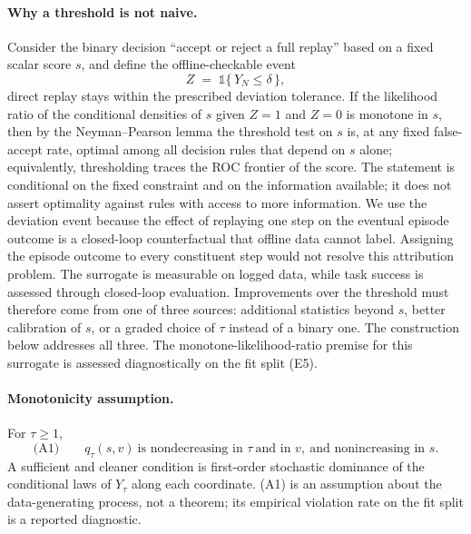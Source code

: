 \documentclass{article}
\begin{document}
\paragraph{Why a threshold is not naive.}
Consider the binary decision ``accept or reject a full replay'' based on a
fixed scalar score $s$, and define the offline-checkable event
\begin{equation}
Z \;=\; \mathbb{1}\{\, Y_N \le \delta \,\},
\label{eq:Z}
\end{equation}
direct replay stays within the prescribed deviation tolerance. If the
likelihood ratio of the conditional densities of $s$ given $Z = 1$ and
$Z = 0$ is monotone in $s$, then by the Neyman--Pearson lemma the threshold
test on $s$ is, at any fixed false-accept rate, optimal among all decision
rules that depend on $s$ alone; equivalently, thresholding traces the ROC
frontier of the score. The statement is conditional on the fixed constraint
and on the information available; it does not assert optimality against rules
with access to more information. We use the deviation event because the
effect of replaying one step on the eventual episode outcome is a closed-loop
counterfactual that offline data cannot label. Assigning the episode outcome
to every constituent step would not resolve this attribution problem. The
surrogate is measurable on logged data, while task success is assessed through
closed-loop evaluation. Improvements over the threshold must therefore come
from one of three sources: additional statistics beyond $s$, better
calibration of $s$, or a graded choice of $\tau$ instead of a binary one. The
construction below addresses all three. The monotone-likelihood-ratio premise
for this surrogate is assessed diagnostically on the fit split (E5).

\paragraph{Monotonicity assumption.}
For $\tau \ge 1$,
\begin{equation}
\text{(A1)}\qquad q_\tau(s, v)\ \text{is nondecreasing in } \tau\
\text{and in } v,\ \text{and nonincreasing in } s .
\label{eq:A1}
\end{equation}
A sufficient and cleaner condition is first-order stochastic dominance of the
conditional laws of $Y_\tau$ along each coordinate. (A1) is an assumption
about the data-generating process, not a theorem; its empirical violation
rate on the fit split is a reported diagnostic.
\end{document}
